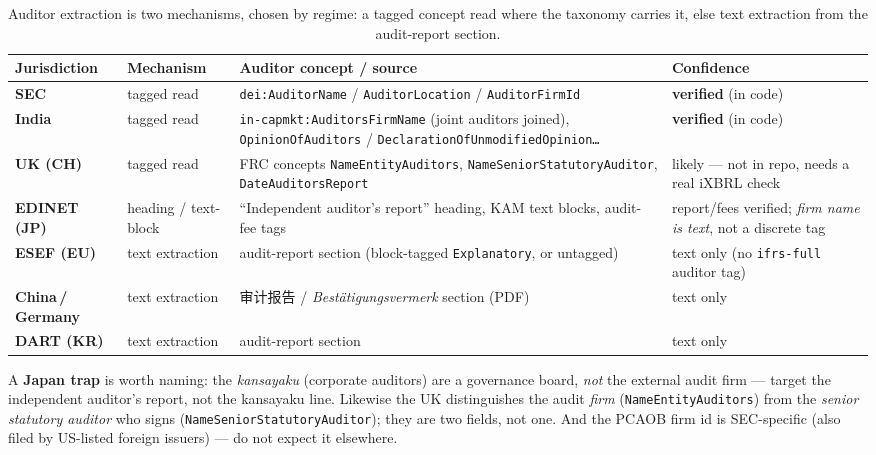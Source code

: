\documentclass[11pt,a4paper]{report}
\newcommand{\cncjk}[2]{{\cjkCNfont #1}}
\begin{document}
\begin{table}[h]
\centering
\small
\caption{Auditor extraction is two mechanisms, chosen by regime: a tagged concept read where the taxonomy
carries it, else text extraction from the audit-report section.}
\label{tab:auditor-split}
\begin{tabular}{@{}p{}p{}p{}p{}@{}}
\toprule
\textbf{Jurisdiction} & \textbf{Mechanism} & \textbf{Auditor concept / source} & \textbf{Confidence} \\
\midrule
\textbf{SEC} & tagged read & \texttt{dei:AuditorName} / \texttt{AuditorLocation} / \texttt{AuditorFirmId} & \textbf{verified} (in code) \\
\textbf{India} & tagged read & \texttt{in-capmkt:AuditorsFirmName} (joint auditors joined), \texttt{OpinionOfAuditors} / \texttt{DeclarationOfUnmodifiedOpinion\ldots} & \textbf{verified} (in code) \\
\textbf{UK (CH)} & tagged read & FRC concepts \texttt{NameEntityAuditors}, \texttt{NameSeniorStatutoryAuditor}, \texttt{DateAuditorsReport} & likely --- not in repo, needs a real iXBRL check \\
\textbf{EDINET (JP)} & heading / text-block & ``Independent auditor's report'' heading, KAM text blocks, audit-fee tags & report/fees verified; \emph{firm name is text}, not a discrete tag \\
\textbf{ESEF (EU)} & text extraction & audit-report section (block-tagged \texttt{Explanatory}, or untagged) & text only (no \texttt{ifrs-full} auditor tag) \\
\textbf{China\,/\,Germany} & text extraction & \cncjk{审计报告}{} / \emph{Bestätigungsvermerk} section (PDF) & text only \\
\textbf{DART (KR)} & text extraction & audit-report section & text only \\
\bottomrule
\end{tabular}
\end{table}

\noindent A \textbf{Japan trap} is worth naming: the \emph{kansayaku} (corporate auditors) are a governance
board, \emph{not} the external audit firm --- target the independent auditor's report, not the kansayaku
line. Likewise the UK distinguishes the audit \emph{firm} (\texttt{NameEntityAuditors}) from the
\emph{senior statutory auditor} who signs (\texttt{NameSeniorStatutoryAuditor}); they are two fields, not
one. And the PCAOB firm id is SEC-specific (also filed by US-listed foreign issuers) --- do not expect it
elsewhere.
\end{document}
